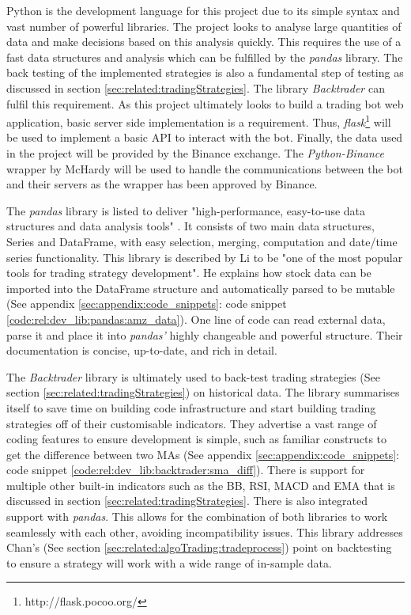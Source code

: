Python is the development language for this project due to its simple syntax and vast number of powerful libraries. The project looks to analyse large quantities of data and make decisions based on this analysis quickly. This requires the use of a fast data structures and analysis which can be fulfilled by the \textit{pandas} \cite{WEB:PANDAS} library. The back testing of the implemented strategies is also a fundamental step of testing as discussed in section \ref{sec:related:tradingStrategies}. The library \textit{Backtrader} \cite{MISC:BACKTRADER} can fulfil this requirement. As this project ultimately looks to build a trading bot web application, basic server side implementation is a requirement. Thus, \textit{flask}\footnote{http://flask.pocoo.org/}  will be used to implement a basic API to interact with the bot. Finally, the data used in the project will be provided by the Binance exchange. The \textit{Python-Binance} wrapper by McHardy \cite{MISC:Python-Binance} will be used to handle the communications between the bot and their servers as the wrapper has been approved by Binance.

The \textit{pandas} library is listed to deliver "high-performance, easy-to-use data structures and data analysis tools" \cite{WEB:PANDAS}. It consists of two main data structures, Series and DataFrame, with easy selection, merging, computation and date/time series functionality. This library is described by Li \cite{ART:LI:2018} to be "one of the most popular tools for trading strategy development". He explains how stock data can be imported into the DataFrame structure and automatically parsed to be mutable (See appendix \ref{sec:appendix:code_snippets}: code snippet \ref{code:rel:dev_lib:pandas:amz_data}). One line of code can read external data, parse it and place it into \textit{pandas'} highly changeable and powerful structure. Their documentation is concise, up-to-date, and rich in detail.

The \textit{Backtrader} \cite{MISC:BACKTRADER} library is ultimately used to back-test trading strategies (See section \ref{sec:related:tradingStrategies}) on historical data. The library summarises itself to save time on building code infrastructure and start building trading strategies off of their customisable indicators. They advertise a vast range of coding features to ensure development is simple, such as familiar constructs to get the difference between two MAs (See appendix \ref{sec:appendix:code_snippets}: code snippet \ref{code:rel:dev_lib:backtrader:sma_diff}). There is support for multiple other built-in indicators such as the BB, RSI, MACD and EMA that is discussed in section \ref{sec:related:tradingStrategies}. There is also integrated support with \textit{pandas}. This allows for the combination of both libraries to work seamlessly with each other, avoiding incompatibility issues. This library addresses Chan's \cite{BOOK:Chan:2013} (See section \ref{sec:related:algoTrading:tradeprocess}) point on backtesting to ensure a strategy will work with a wide range of in-sample data.

